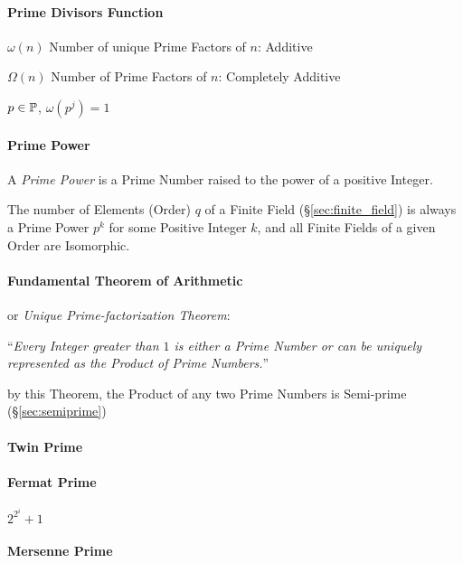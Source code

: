 \paragraph{Prime Divisors Function}\label{sec:prime_divisors}\hfill

$\omega(n)$ Number of unique Prime Factors of $n$: Additive

$\Omega(n)$ Number of Prime Factors of $n$: Completely Additive

$p \in \mathbb{P}$, $\omega(p^j) = 1$



\paragraph{Prime Power}\label{sec:prime_power}\hfill

A \emph{Prime Power} is a Prime Number raised to the power of a
positive Integer.

The number of Elements (Order) $q$ of a Finite Field (\S\ref{sec:finite_field})
is always a Prime Power $p^k$ for some Positive Integer $k$, and all Finite
Fields of a given Order are Isomorphic.



\paragraph{Fundamental Theorem of Arithmetic}
\label{sec:fundamental_arithmetic_theorem}\hfill

or \emph{Unique Prime-factorization Theorem}:

``\emph{Every Integer greater than $1$ is either a Prime Number or can be
  uniquely represented as the Product of Prime Numbers.}''

by this Theorem, the Product of any two Prime Numbers is Semi-prime
(\S\ref{sec:semiprime})



\paragraph{Twin Prime}\label{sec:twin_prime}\hfill

\paragraph{Fermat Prime}\label{sec:fermat_prime}\hfill

$2^{2^i} + 1$



\paragraph{Mersenne Prime}\label{sec:mersenne_prime}\hfill

